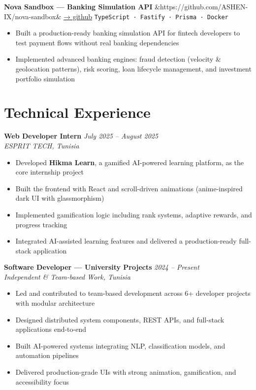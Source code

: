 \documentclass[10pt, a4paper]{article}
\newcommand{\jobentry}[3]{%
  \textbf{\color{navy}#1} \hfill \textit{\color{muted}\small #3}\\
  \textit{\color{muted}\small #2}%
}
\newcommand{\projectentry}[3]{%
  \textbf{\color{navy}#1}%
  \ifx&#2&\else
    \enspace\href{#2}{\small\color{accent}→ github}%
  \fi
  \hfill \texttt{\footnotesize\color{muted}#3}%
}
\begin{document}
\vspace{3pt}
\projectentry{Nova Sandbox --- Banking Simulation API}{https://github.com/ASHEN-IX/nova-sandbox}{TypeScript · Fastify · Prisma · Docker}
\begin{itemize}
  \item Built a production-ready banking simulation API for fintech developers to test payment flows without real banking dependencies
  \item Implemented advanced banking engines: fraud detection (velocity \& geolocation patterns), risk scoring, loan lifecycle management, and investment portfolio simulation
\end{itemize}

\section{Technical Experience}

\jobentry{Web Developer Intern}{ESPRIT TECH, Tunisia}{July 2025 -- August 2025}
\begin{itemize}
  \item Developed \textbf{Hikma Learn}, a gamified AI-powered learning platform, as the core internship project
  \item Built the frontend with React and scroll-driven animations (anime-inspired dark UI with glassmorphism)
  \item Implemented gamification logic including rank systems, adaptive rewards, and progress tracking
  \item Integrated AI-assisted learning features and delivered a production-ready full-stack application
\end{itemize}

\vspace{4pt}
\jobentry{Software Developer --- University Projects}{Independent \& Team-based Work, Tunisia}{2024 -- Present}
\begin{itemize}
  \item Led and contributed to team-based development across 6+ developer projects with modular architecture
  \item Designed distributed system components, REST APIs, and full-stack applications end-to-end
  \item Built AI-powered systems integrating NLP, classification models, and automation pipelines
  \item Delivered production-grade UIs with strong animation, gamification, and accessibility focus
\end{itemize}
\end{document}
